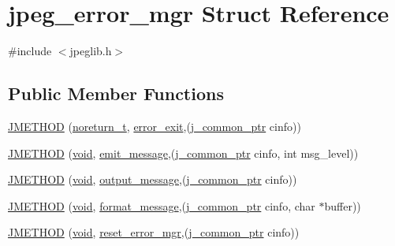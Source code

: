 \hypertarget{structjpeg__error__mgr}{}\section{jpeg\+\_\+error\+\_\+mgr Struct Reference}
\label{structjpeg__error__mgr}


{\ttfamily \#include $<$jpeglib.\+h$>$}

\subsection*{Public Member Functions}
\begin{DoxyCompactItemize}
\item 
\hyperlink{structjpeg__error__mgr_a72c40bceda2e6cb78046165e6892ac3a}{J\+M\+E\+T\+H\+O\+D} (\hyperlink{jmorecfg_8h_abaffdc8256e7ef5c7565ca45e6d3e628}{noreturn\+\_\+t}, \hyperlink{jerror_8c_ac6efeb7cb80ae59d9ccdf1a16e20b2ff}{error\+\_\+exit},(\hyperlink{jpeglib_8h_a1a177ab705cefea8f30ec31a48e62650}{j\+\_\+common\+\_\+ptr} cinfo))
\item 
\hyperlink{structjpeg__error__mgr_a73c0a027b6e6cb8ff2b7b0fc42f756f9}{J\+M\+E\+T\+H\+O\+D} (\hyperlink{png_8h_aa8c59027f9ab2769342f248709d68d17}{void}, \hyperlink{jerror_8c_a0f5ad91b180dbac82fb322091d5b390a}{emit\+\_\+message},(\hyperlink{jpeglib_8h_a1a177ab705cefea8f30ec31a48e62650}{j\+\_\+common\+\_\+ptr} cinfo, int msg\+\_\+level))
\item 
\hyperlink{structjpeg__error__mgr_ac2989f8ef34acdd78ce26a9110a1c094}{J\+M\+E\+T\+H\+O\+D} (\hyperlink{png_8h_aa8c59027f9ab2769342f248709d68d17}{void}, \hyperlink{jerror_8c_ac726e73416c0b5394af1a4275dd61346}{output\+\_\+message},(\hyperlink{jpeglib_8h_a1a177ab705cefea8f30ec31a48e62650}{j\+\_\+common\+\_\+ptr} cinfo))
\item 
\hyperlink{structjpeg__error__mgr_a5f1dfb51c337c36ae1bc5fae7f84528f}{J\+M\+E\+T\+H\+O\+D} (\hyperlink{png_8h_aa8c59027f9ab2769342f248709d68d17}{void}, \hyperlink{jerror_8c_a67e2834aaaecd3d95b274bf47f96cd2a}{format\+\_\+message},(\hyperlink{jpeglib_8h_a1a177ab705cefea8f30ec31a48e62650}{j\+\_\+common\+\_\+ptr} cinfo, char $\ast$buffer))
\item 
\hyperlink{structjpeg__error__mgr_ac676478083167b3731995d7901bd4b6c}{J\+M\+E\+T\+H\+O\+D} (\hyperlink{png_8h_aa8c59027f9ab2769342f248709d68d17}{void}, \hyperlink{jerror_8c_acd2c85048aefc02e56fc620974c5564b}{reset\+\_\+error\+\_\+mgr},(\hyperlink{jpeglib_8h_a1a177ab705cefea8f30ec31a48e62650}{j\+\_\+common\+\_\+ptr} cinfo))
\end{DoxyCompactItemize}
